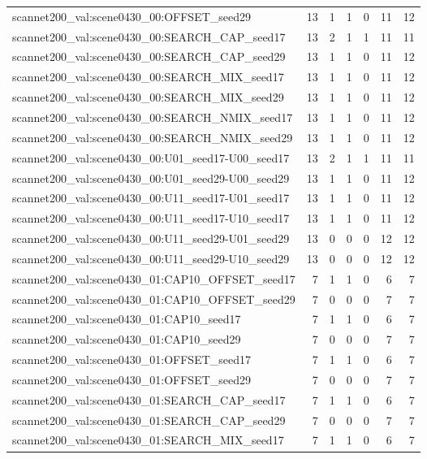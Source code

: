 \begin{table}[t]
\begin{tabular}{lrrrrrr}
scannet200\_val:scene0430\_00:OFFSET\_seed29 & 13 & 1 & 1 & 0 & 11 & 12 \\
scannet200\_val:scene0430\_00:SEARCH\_CAP\_seed17 & 13 & 2 & 1 & 1 & 11 & 11 \\
scannet200\_val:scene0430\_00:SEARCH\_CAP\_seed29 & 13 & 1 & 1 & 0 & 11 & 12 \\
scannet200\_val:scene0430\_00:SEARCH\_MIX\_seed17 & 13 & 1 & 1 & 0 & 11 & 12 \\
scannet200\_val:scene0430\_00:SEARCH\_MIX\_seed29 & 13 & 1 & 1 & 0 & 11 & 12 \\
scannet200\_val:scene0430\_00:SEARCH\_NMIX\_seed17 & 13 & 1 & 1 & 0 & 11 & 12 \\
scannet200\_val:scene0430\_00:SEARCH\_NMIX\_seed29 & 13 & 1 & 1 & 0 & 11 & 12 \\
scannet200\_val:scene0430\_00:U01\_seed17-U00\_seed17 & 13 & 2 & 1 & 1 & 11 & 11 \\
scannet200\_val:scene0430\_00:U01\_seed29-U00\_seed29 & 13 & 1 & 1 & 0 & 11 & 12 \\
scannet200\_val:scene0430\_00:U11\_seed17-U01\_seed17 & 13 & 1 & 1 & 0 & 11 & 12 \\
scannet200\_val:scene0430\_00:U11\_seed17-U10\_seed17 & 13 & 1 & 1 & 0 & 11 & 12 \\
scannet200\_val:scene0430\_00:U11\_seed29-U01\_seed29 & 13 & 0 & 0 & 0 & 12 & 12 \\
scannet200\_val:scene0430\_00:U11\_seed29-U10\_seed29 & 13 & 0 & 0 & 0 & 12 & 12 \\
scannet200\_val:scene0430\_01:CAP10\_OFFSET\_seed17 & 7 & 1 & 1 & 0 & 6 & 7 \\
scannet200\_val:scene0430\_01:CAP10\_OFFSET\_seed29 & 7 & 0 & 0 & 0 & 7 & 7 \\
scannet200\_val:scene0430\_01:CAP10\_seed17 & 7 & 1 & 1 & 0 & 6 & 7 \\
scannet200\_val:scene0430\_01:CAP10\_seed29 & 7 & 0 & 0 & 0 & 7 & 7 \\
scannet200\_val:scene0430\_01:OFFSET\_seed17 & 7 & 1 & 1 & 0 & 6 & 7 \\
scannet200\_val:scene0430\_01:OFFSET\_seed29 & 7 & 0 & 0 & 0 & 7 & 7 \\
scannet200\_val:scene0430\_01:SEARCH\_CAP\_seed17 & 7 & 1 & 1 & 0 & 6 & 7 \\
scannet200\_val:scene0430\_01:SEARCH\_CAP\_seed29 & 7 & 0 & 0 & 0 & 7 & 7 \\
scannet200\_val:scene0430\_01:SEARCH\_MIX\_seed17 & 7 & 1 & 1 & 0 & 6 & 7 \\

\end{tabular}
\end{table}
